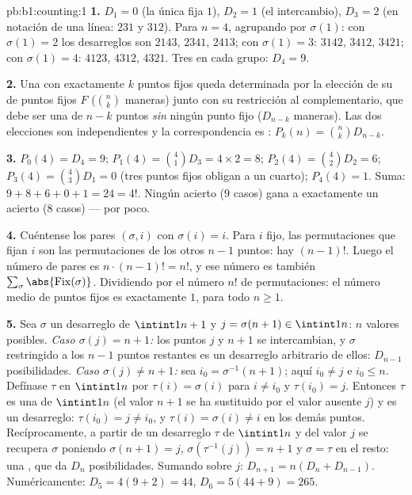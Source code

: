 \begin{solution}{pb:b1:counting:1}
\textbf{1.} $D_1 = 0$ (la única  fija $1$), $D_2 = 1$ (el
intercambio), $D_3 = 2$ (en notación de una línea: $231$ y $312$). Para
$n = 4$, agrupando por $\sigma(1)$: con $\sigma(1) = 2$ los desarreglos
son $2143$, $2341$, $2413$; con $\sigma(1) = 3$: $3142$, $3412$,
$3421$; con $\sigma(1) = 4$: $4123$, $4312$, $4321$. Tres en cada
grupo: $D_4 = 9$.

\textbf{2.} Una  con exactamente $k$ puntos fijos queda
determinada por la elección de su  de puntos fijos $F$
($\binom nk$ maneras) junto con su restricción al complementario, que
debe ser una  de $n - k$ puntos \emph{sin} ningún punto fijo
($D_{n-k}$ maneras). Las dos elecciones son independientes y la
correspondencia es : $P_k(n) = \binom nk D_{n-k}$.

\textbf{3.} $P_0(4) = D_4 = 9$; $P_1(4) = \binom41 D_3 = 4 \times 2
= 8$; $P_2(4) = \binom42 D_2 = 6$; $P_3(4) = \binom43 D_1 = 0$ (tres
puntos fijos obligan a un cuarto); $P_4(4) = 1$. Suma:
$9 + 8 + 6 + 0 + 1 = 24 = 4!$. Ningún acierto ($9$ casos) gana a
exactamente un acierto ($8$ casos) --- por poco.

\textbf{4.} Cuéntense los pares $(\sigma, i)$ con $\sigma(i) = i$. Para
$i$ fijo, las permutaciones que fijan $i$ son las permutaciones de los
otros $n - 1$ puntos: hay $(n-1)!$. Luego el número de pares es
$n \cdot (n-1)! = n!$, y ese número es también
$\sum_\sigma \abs{\mathrm{Fix}(\sigma)}$. Dividiendo por el número $n!$
de permutaciones: el número medio de puntos fijos es exactamente $1$,
para todo $n \geq 1$.

\textbf{5.} Sea $\sigma$ un desarreglo de $\intint1{n+1}$ y
$j = \sigma(n+1) \in \intint1n$: $n$ valores posibles. \emph{Caso
$\sigma(j) = n+1$:} los puntos $j$ y $n+1$ se intercambian, y $\sigma$
restringido a los $n - 1$ puntos restantes es un desarreglo arbitrario
de ellos: $D_{n-1}$ posibilidades. \emph{Caso $\sigma(j) \neq n+1$:} sea
$i_0 = \sigma^{-1}(n+1)$; aquí $i_0 \neq j$ e $i_0 \leq n$. Defínase
$\tau$ en $\intint1n$ por $\tau(i) = \sigma(i)$ para $i \neq i_0$ y
$\tau(i_0) = j$. Entonces $\tau$ es una  de $\intint1n$ (el
valor $n+1$ se ha sustituido por el valor ausente $j$) y es un
desarreglo: $\tau(i_0) = j \neq i_0$, y $\tau(i) = \sigma(i) \neq i$ en
los demás puntos. Recíprocamente, a partir de un desarreglo $\tau$ de
$\intint1n$ y del valor $j$ se recupera $\sigma$ poniendo
$\sigma(n+1) = j$, $\sigma(\tau^{-1}(j)) = n+1$ y $\sigma = \tau$ en el
resto: una , que da $D_n$ posibilidades. Sumando sobre $j$:
$D_{n+1} = n(D_n + D_{n-1})$. Numéricamente: $D_5 = 4(9 + 2) = 44$,
$D_6 = 5(44 + 9) = 265$.


\end{solution}
